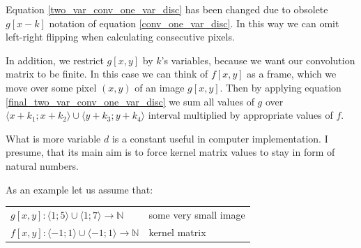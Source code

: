 \documentclass{article}
\makeatletter
\newenvironment{conditions}
  {\par\vspace{\abovedisplayskip}\noindent\begin{tabular}{>{$}l<{$} @{${}\equiv{}$} l}}
  {\end{tabular}\par\vspace{\belowdisplayskip}}
\makeatother
\begin{document}
\begin{description}
Equation \ref{two_var_conv_one_var_disc} has been changed due to obsolete $g[x-k]$ notation of equation \ref{conv_one_var_disc}. In this way we can omit left-right flipping when calculating consecutive pixels.

In addition, we restrict $g[x,y]$ by $k$'s variables, because we want our convolution matrix to be finite. 
In this case we can think of $f[x,y]$ as a frame, which we move over some pixel $(x,y)$ of an image $g[x,y]$. Then by applying equation \ref{final_two_var_conv_one_var_disc} we sum all values of $g$ over
$ \langle x + k_1; x+ k_2 \rangle \cup \langle y + k_3 ; y + k_4 \rangle$ interval multiplied by appropriate values of $f$.

What is more variable $d$ is a constant useful in computer implementation. I presume, that its main aim is to force kernel matrix values to stay in form of natural numbers.

As an example let us assume that:
\begin{conditions} 
  g[x,y] : \langle 1; 5 \rangle \cup \langle 1 ; 7 \rangle \rightarrow \mathbb{N} & some very small image\\
  f[x,y] : \langle -1; 1 \rangle \cup \langle -1 ; 1 \rangle \rightarrow \mathbb{N} & kernel matrix \\
\end{conditions}


\end{description}
\end{document}
